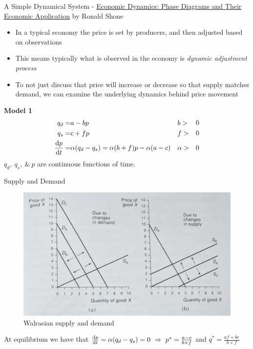 \documentclass{article}
\begin{document}
	A Simple Dynamical System - \underline{Economic Dynamics: Phase Diagrams and Their Economic Application} by Ronald Shone
	\begin{itemize}
		\item In a typical economy the price is set by producers, and then adjusted based on observations
		\item This means typically what is observed in the economy is \emph{dynamic adjustment process}
		\item To not just discuss that price will increase or decrease so that supply matches demand, we can examine the underlying dynamics behind price movement
	\end{itemize}
	
	\textbf{Model 1}
	\begin{align*}
		q_d =& a - bp && b >& 0\\ %
		q_s =& c + fp && f >& 0 \\ %
		\frac{\d p}{\d t} =& \alpha(q_d - q_s) = \alpha(b+f)p - \alpha(a-c) && \alpha >& 0
	\end{align*}
	$q_d,\ q_s,\ \&\ p$ are continuous functions of time.

Supply and Demand
	\begin{figure}
		\centering
			\includegraphics{Figures/SnD.png}
		\caption{Walrasian supply and demand}
	\end{figure}
	
	At equilibrium we have that $\frac{\mathrm{d} p}{\mathrm{d} t} = \alpha(q_d - q_s) = 0 \ \Rightarrow \ p^* = \frac{a-c}{b+f}$ and $q^* = \frac{af + bc}{b+f}$
\end{document}

